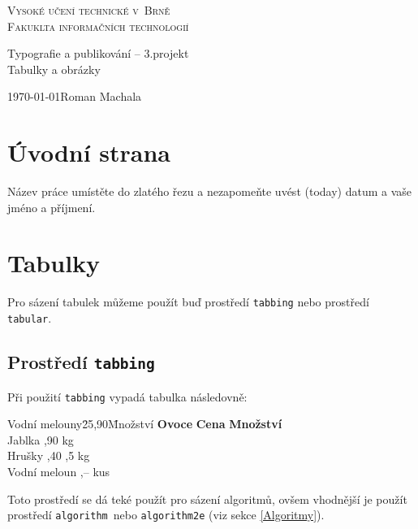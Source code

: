 \documentclass[hidelinks, 11pt, a4paper]{article}[24.03.2023]
\begin{document}
    \begin{titlepage}
        \begin{center}
            {\Huge \textsc{Vysoké učení technické v~Brně}\\[0.5em]}
            {\huge \textsc{Fakuklta informačních technologií}}

            {\LARGE Typografie a publikování -- 3.projekt\\[0.4em]}
            {\huge Tabulky a obrázky}

            {\Large \today \hfill Roman Machala}

        \end{center}
    \end{titlepage}

\section{Úvodní strana}
    Název práce umístěte do zlatého řezu a nezapomeňte uvést  (today) datum a vaše jméno a příjmení.
    
\section{Tabulky}
    Pro sázení tabulek můžeme použít buď prostředí\; \verb|tabbing|\; nebo prostředí\; \verb|tabular|. 
    \subsection[tabbing]{Prostředí \texttt{tabbing}}
        Při použití\; \verb|tabbing|\; vypadá tabulka následovně:
        \begin{tabbing}
            Vodní melouny\quad \= 25,90\quad \= Množství \kill
            \textbf{Ovoce} \> \textbf{Cena} \> \textbf{Množství} \\
            Jablka ,90  kg  \\
            Hrušky ,40 ,5 kg  \\
            Vodní meloun ,--  kus
        \end{tabbing}
        Toto prostředí se dá teké použít pro sázení algoritmů, ovšem vhodnější je použít prostředí\; \verb|algorithm|\;~nebo \verb|algorithm2e|\; (viz sekce \ref{Algoritmy}).
\end{document}
